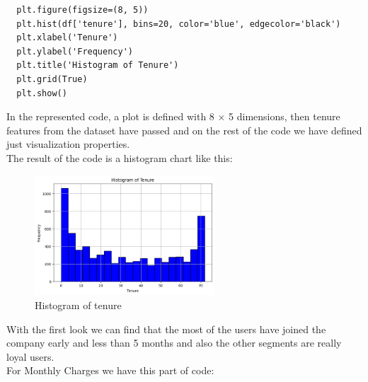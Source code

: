 \documentclass[12pt]{article}
\begin{document}
\begin{lstlisting}
  plt.figure(figsize=(8, 5))
  plt.hist(df['tenure'], bins=20, color='blue', edgecolor='black')
  plt.xlabel('Tenure')
  plt.ylabel('Frequency')
  plt.title('Histogram of Tenure')
  plt.grid(True)
  plt.show()
\end{lstlisting}
\vspace{\baselineskip}
In the represented code, a plot is defined with 8 $\times$ 5 dimensions, then tenure features from the dataset have passed and on the rest of the code we have defined just visualization properties.\\
The result of the code is a histogram chart like this:
\begin{figure}[htbp]
  \centering
  \includegraphics[width=0.6\textwidth]{assets/hist_tenure.png}
  \caption{Histogram of tenure}
\end{figure}
\vspace{\baselineskip}
\newline
With the first look we can find that the most of the users have joined the company early and less than 5 months and also the other segments are really loyal users.\\
\vspace{\baselineskip}
\newline
For Monthly Charges we have this part of code:

\vspace{1cm}
\end{document}
